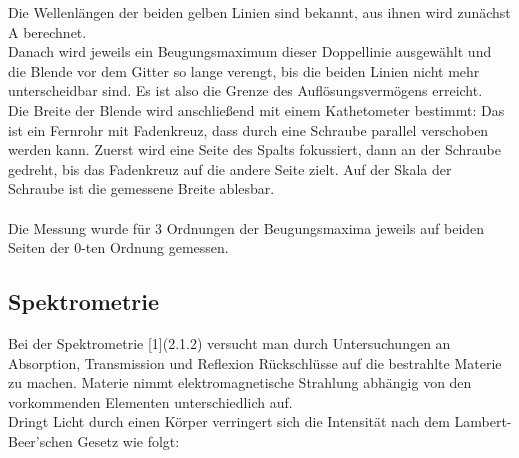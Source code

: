 \documentclass[12pt,a4paper]{article}
\begin{document}
\begin{multicols}{2}
Die Wellenlängen der beiden gelben Linien sind bekannt, aus ihnen wird zunächst A berechnet.\\
Danach wird jeweils ein Beugungsmaximum dieser Doppellinie ausgewählt und die Blende vor dem Gitter so lange verengt, bis die beiden Linien nicht mehr unterscheidbar sind. Es ist also die Grenze des Auflösungsvermögens erreicht.\\
Die Breite der Blende wird anschließend mit einem Kathetometer bestimmt: Das ist ein Fernrohr mit Fadenkreuz, dass durch eine Schraube parallel verschoben werden kann. Zuerst wird eine Seite des Spalts fokussiert, dann an der Schraube gedreht, bis das Fadenkreuz auf die andere Seite zielt. Auf der Skala der Schraube ist die gemessene Breite ablesbar.\\
\\
Die Messung wurde für 3 Ordnungen der Beugungsmaxima jeweils auf beiden Seiten der 0-ten Ordnung gemessen.\\




\subsection{Spektrometrie}
Bei der Spektrometrie [1](2.1.2) versucht man durch Untersuchungen an Absorption, Transmission und Reflexion Rückschlüsse auf die bestrahlte Materie zu machen. Materie nimmt elektromagnetische Strahlung abhängig von den vorkommenden Elementen unterschiedlich auf. \\
Dringt Licht durch einen Körper verringert sich die Intensität nach dem Lambert-Beer'schen Gesetz wie folgt:


\end{multicols}
\end{document}
